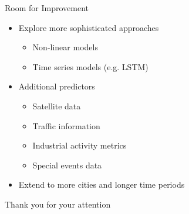 \documentclass[svgnames, 12pt]{beamer}
\begin{document}
\begin{frame}{Room for Improvement}
\begin{itemize}
    \item Explore more sophisticated approaches
        \begin{itemize}
            \item Non-linear models
            \item Time series models (e.g. LSTM)
        \end{itemize}
    \item Additional predictors
        \begin{itemize}
            \item Satellite data
            \item Traffic information
            \item Industrial activity metrics
            \item Special events data
        \end{itemize}
    \item Extend to more cities and longer time periods
\end{itemize}
\end{frame}


\begin{frame}
\begin{center}
\LARGE
\color{mifcolor} Thank you for your attention
\end{center}
\end{frame}
\end{document}
